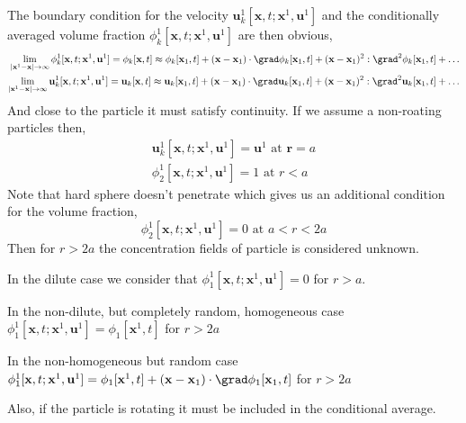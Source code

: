 The boundary condition for the velocity $\textbf{u}_k^1[\textbf{x},t;\textbf{x}^1,\textbf{u}^1]$ and the conditionally averaged volume fraction $\phi_k^1[\textbf{x},t;\textbf{x}^1,\textbf{u}^1]$ are then obvious, 
\begin{align*}
    \lim_{|\textbf{x}^1 - \textbf{x}| \to \infty} \phi^1_k[\textbf{x},t;\textbf{x}^1,\textbf{u}^1] =\phi_k[\textbf{x},t]
    \approx \phi_k[\textbf{x}_1,t] + (\textbf{x} - \textbf{x}_1)\cdot \grad \phi_k[\textbf{x}_1,t] + (\textbf{x} - \textbf{x}_1)^2: \grad^2 \phi_k[\textbf{x}_1,t] + \ldots\\
    \lim_{|\textbf{x}^1 - \textbf{x}| \to \infty} \textbf{u}_k^1[\textbf{x},t;\textbf{x}^1,\textbf{u}^1] = \textbf{u}_k[\textbf{x},t]
    \approx \textbf{u}_k[\textbf{x}_1,t] + (\textbf{x} - \textbf{x}_1)\cdot \grad \textbf{u}_k[\textbf{x}_1,t] + (\textbf{x} - \textbf{x}_1)^2: \grad^2 \textbf{u}_k[\textbf{x}_1,t] + \ldots 
\end{align*}
And close to the particle it must satisfy continuity. 
If we assume a non-roating particles then, 
\begin{align*}
    \textbf{u}_k^1[\textbf{x},t;\textbf{x}^1,\textbf{u}^1]
    = \textbf{u}^1
    \text{ at } \textbf{r} = a\\
    \phi_2^1 [\textbf{x},t;\textbf{x}^1,\textbf{u}^1] = 1 
    \text{ at } 
    r < a
\end{align*}
Note that hard sphere doesn't penetrate which gives us an additional condition for the volume fraction, 
\begin{equation*}
    \phi_2^1 [\textbf{x},t;\textbf{x}^1,\textbf{u}^1] = 0 
    \text{ at } 
    a< r < 2a
\end{equation*}
Then for $r > 2a$ the concentration fields of particle is considered unknown. 
\begin{remark}
    In the dilute case we consider that $\phi_1^1[\textbf{x},t;\textbf{x}^1,\textbf{u}^1] = 0$ for $r >a$. 
\end{remark}
\begin{remark}
    In the non-dilute, but completely random, homogeneous case 
    $\phi_1^1[\textbf{x},t;\textbf{x}^1,\textbf{u}^1] = \phi_1[\textbf{x}^1,t]$ for $r > 2a$
\end{remark}
\begin{remark}
    In the non-homogeneous but random case $\phi_1^1[\textbf{x},t;\textbf{x}^1,\textbf{u}^1] = \phi_1[\textbf{x}^1,t]+(\textbf{x}-\textbf{x}_1)\cdot\grad \phi_1[\textbf{x}_1,t]$ for $r > 2a$
\end{remark}
Also, if the particle is rotating it must be included in the conditional average. 
